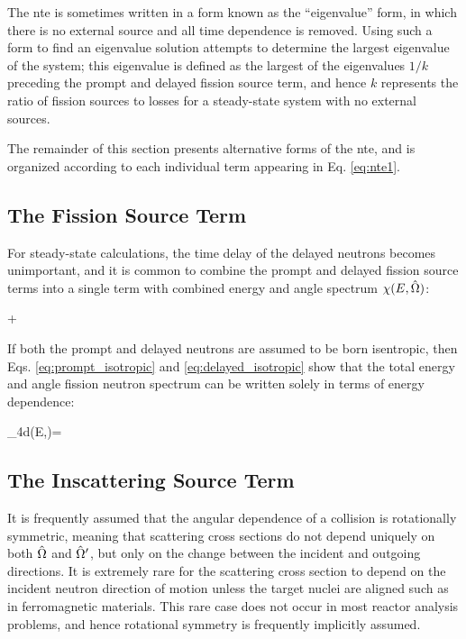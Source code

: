 The \gls{nte} is sometimes written in a form known as the ``eigenvalue'' form, in which there is no external source and all time dependence is removed. Using such a form to find an eigenvalue solution attempts to determine the largest eigenvalue of the system; this eigenvalue is defined as the largest of the eigenvalues \(1/k\) preceding the prompt and delayed fission source term, and hence \(k\) represents the ratio of fission sources to losses for a steady-state system with no external sources.

The remainder of this section presents alternative forms of the \gls{nte}, and is organized according to each individual term appearing in Eq. \eqref{eq:nte1}.

\subsection{The Fission Source Term}

For steady-state calculations, the time delay of the delayed neutrons becomes unimportant, and it is common to combine the prompt and delayed fission source terms into a single term with combined energy and angle spectrum \(\chi(E,\hat{\Omega})\):

\beqa
\promptfissionsource\psi\seatprime+\delayedfissionsource\rightarrow\\
\totalfissionsource\psi\seatprime
\eeqa

If both the prompt and delayed neutrons are assumed to be born isentropic, then Eqs. \eqref{eq:prompt_isotropic} and \eqref{eq:delayed_isotropic} show that the total energy and angle fission neutron spectrum can be written solely in terms of energy dependence:

\beq
\int_{4\pi}d\hO\chi(E,\hO)=
\eeq

\subsection{The Inscattering Source Term}

It is frequently assumed that the angular dependence of a collision is rotationally symmetric, meaning that scattering cross sections do not depend uniquely on both \(\hat{\Omega}\) and \(\hat{\Omega}'\), but only on the change between the incident and outgoing directions. It is extremely rare for the scattering cross section to depend on the incident neutron direction of motion unless the target nuclei are aligned such as in ferromagnetic materials. This rare case does not occur in most reactor analysis problems, and hence rotational symmetry is frequently implicitly assumed.

